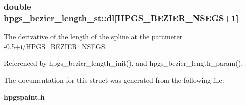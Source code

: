 \subsubsection[dl]{\setlength{\rightskip}{0pt plus 5cm}double {\bf hpgs\_\-bezier\_\-length\_\-st::dl}[HPGS\_\-BEZIER\_\-NSEGS+1]}\label{structhpgs__bezier__length__st_796a0a19c199113346316abce43d4adc}


The derivative of the length of the spline at the parameter -0.5+i/HPGS\_\-BEZIER\_\-NSEGS. 

Referenced by hpgs\_\-bezier\_\-length\_\-init(), and hpgs\_\-bezier\_\-length\_\-param().

The documentation for this struct was generated from the following file:\begin{CompactItemize}
\item 
{\bf hpgspaint.h}\end{CompactItemize}
